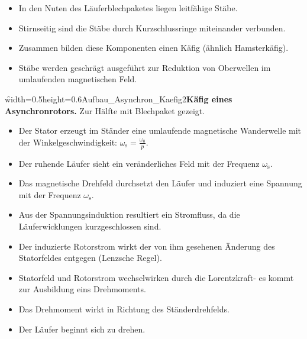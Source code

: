 \begin{frame}
	\begin{itemize}
		\item In den Nuten des Läuferblechpaketes liegen leitfähige Stäbe.
		\item Stirnseitig sind die Stäbe durch Kurzschlussringe miteinander verbunden.
		\item Zusammen bilden diese Komponenten einen Käfig (ähnlich Hamsterkäfig).
		\item Stäbe werden geschrägt ausgeführt zur Reduktion von Oberwellen im umlaufenden magnetischen Feld.
	\end{itemize}
		\f{width=0.5\textwidth}{height=0.6\textheight}{Aufbau_Asynchron_Kaefig2}{{\bf Käfig eines Asynchronrotors.} Zur Hälfte mit Blechpaket gezeigt.}
\end{frame}


\begin{frame}	
	\begin{itemize}
		\item Der Stator erzeugt im Ständer eine umlaufende magnetische Wanderwelle mit der Winkelgeschwindigkeit:
		$\omega_\mathrm{s} = \frac{\omega_0}{p}$.\pause
		\item Der ruhende Läufer sieht ein veränderliches Feld mit der Frequenz $\omega_\mathrm{s}$.\pause
		\item Das magnetische Drehfeld durchsetzt den Läufer und induziert eine Spannung mit der Frequenz $\omega_\mathrm{s}$.\pause
		\item Aus der Spannungsinduktion resultiert ein Stromfluss, da die Läuferwicklungen kurzgeschlossen sind.\pause
		\item Der induzierte Rotorstrom wirkt der von ihm gesehenen Änderung des Statorfeldes entgegen (Lenzsche Regel).\pause
		\item Statorfeld und Rotorstrom wechselwirken durch die Lorentzkraft- es kommt zur Ausbildung eins Drehmoments.\pause
		\item Das Drehmoment wirkt in Richtung des Ständerdrehfelds.\pause
		\item Der Läufer beginnt sich zu drehen.
	\end{itemize}
\end{frame}

